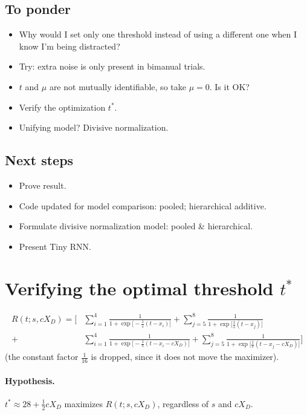 \documentclass[11pt]{article}
\begin{document}
\subsection*{To ponder}
\begin{itemize}
  \item Why would I set only one threshold instead of using a different one when I
  know I'm being distracted?
  \item Try: extra noise is only present in bimanual trials.
  \item $t$ and $\mu$ are not mutually identifiable, so take $\mu = 0$. Is it OK?
  \item Verify the optimization $t^*$.
  \item Unifying model? Divisive normalization.
\end{itemize}

\subsection*{Next steps}
\begin{itemize}
  \item Prove result.
  \item Code updated for model comparison: pooled; hierarchical additive.
  \item Formulate divisive normalization model: pooled \& hierarchical.
  \item Present Tiny RNN.
\end{itemize}

\section{Verifying the optimal threshold $t^*$}\label{sec:verify}

\begin{align*}
  R(t; s, cX_D) = \Biggl[
   &\sum_{i=1}^{4}\frac{1}{1+\exp\bigl[-\frac{1}{s}(t-x_i)\bigr]}
   + \sum_{j=5}^{8}\frac{1}{1+\exp\bigl[\frac{1}{s}(t-x_j)\bigr]}\\
   +&\sum_{i=1}^{4}\frac{1}{1+\exp\bigl[-\frac{1}{s}(t-x_i-cX_D)\bigr]}
   + \sum_{j=5}^{8}\frac{1}{1+\exp\bigl[\frac{1}{s}(t-x_j-cX_D)\bigr]}\Biggr]
\end{align*}
(the constant factor $\frac{1}{16}$ is dropped, since it does not move the maximizer).

\paragraph{Hypothesis.} $t^* \approx 28 + \frac12 cX_D$ maximizes $R(t; s, cX_D)$,
regardless of $s$ and $cX_D$.
\end{document}
